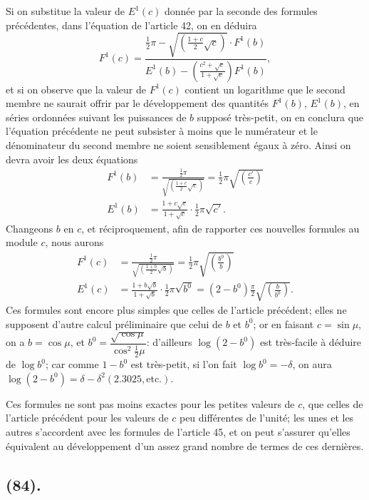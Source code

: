 \documentclass{article}
\begin{document}
Si on substitue la valeur de $E^{1}(c)$ donnée par la seconde des formules précédentes, dans l'équation de l'article 42, on en déduira
\[ F^{1}(c)=\frac{\tfrac{1}{2}\pi-\sqrt{\left(\frac{1+c}{2}\sqrt{c}\right)}\cdot F^{1}(b)}{E^{1}(b)-\left(\frac{c^{2}+\sqrt{c}}{1+\sqrt{c}}\right)F^{1}(b)}, \]
et si on observe que la valeur de $F^{1}(c)$ contient un logarithme que le second membre ne saurait offrir par le développement des quantités $F^{1}(b)$, $E^{1}(b)$, en séries ordonnées suivant les puissances de $b$ supposé très-petit, on en conclura que l'équation précédente ne peut subsister à moins que le numérateur et le dénominateur du second membre ne soient sensiblement égaux à zéro. Ainsi on devra avoir les deux équations
\[ \begin{aligned} F^{1}(b)&=\frac{\tfrac{1}{2}\pi}{\sqrt{\left(\frac{1+c}{2}\sqrt{c}\right)}}=\tfrac{1}{2}\pi\sqrt{\left(\frac{c'}{c}\right)}\\ E^{1}(b)&=\frac{1+c\sqrt{c}}{1+\sqrt{c}}\cdot\tfrac{1}{2}\pi\sqrt{c'}. \end{aligned} \]
Changeons $b$ en $c$, et réciproquement, afin de rapporter ces nouvelles formules au module $c$, nous aurons
\[ \begin{aligned} F^{1}(c)&=\frac{\tfrac{1}{2}\pi}{\sqrt{\left(\frac{1+b}{2}\sqrt{b}\right)}}=\tfrac{1}{2}\pi\sqrt{\left(\frac{b^{0}}{b}\right)}\\ E^{1}(c)&=\frac{1+b\sqrt{b}}{1+\sqrt{b}}\cdot\tfrac{1}{2}\pi\sqrt{b^{0}}=(2-b^{0})\frac{\pi}{2}\sqrt{\left(\frac{b}{b^{0}}\right)}. \end{aligned} \]
Ces formules sont encore plus simples que celles de l'article précédent; elles ne supposent d'autre calcul préliminaire que celui de $b$ et $b^{0}$; or en faisant $c=\sin\mu$, on a $b=\cos\mu$, et $b^{0}=\dfrac{\sqrt{\cos\mu}}{\cos^{2}\frac{1}{2}\mu}$: d'ailleurs $\log(2-b^{0})$ est très-facile à déduire de $\log b^{0}$; car comme $1-b^{0}$ est très-petit, si l'on fait $\log b^{0}=-\delta$, on aura $\log(2-b^{0})=\delta-\delta^{2}(2.3025,\text{etc.})$.

Ces formules ne sont pas moins exactes pour les petites valeurs de $c$, que celles de l'article précédent pour les valeurs de $c$ peu différentes de l'unité; les unes et les autres s'accordent avec les formules de l'article 45, et on peut s'assurer qu'elles équivalent au développement d'un assez grand nombre de termes de ces dernières.

\subsection*{(84).}
\end{document}
